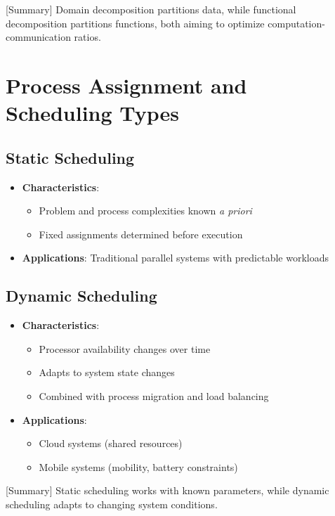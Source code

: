 \documentclass[12pt]{article}
\begin{document}
[Summary] Domain decomposition partitions data, while functional decomposition partitions functions, both aiming to optimize computation-communication ratios.

\section{Process Assignment and Scheduling Types}

\subsection{Static Scheduling}
\begin{itemize}
\item \textbf{Characteristics}:
  \begin{itemize}
  \item Problem and process complexities known \textit{a priori}
  \item Fixed assignments determined before execution
  \end{itemize}
  
\item \textbf{Applications}: Traditional parallel systems with predictable workloads
\end{itemize}

\subsection{Dynamic Scheduling}
\begin{itemize}
\item \textbf{Characteristics}:
  \begin{itemize}
  \item Processor availability changes over time
  \item Adapts to system state changes
  \item Combined with process migration and load balancing
  \end{itemize}
  
\item \textbf{Applications}:
  \begin{itemize}
  \item Cloud systems (shared resources)
  \item Mobile systems (mobility, battery constraints)
  \end{itemize}
\end{itemize}

[Summary] Static scheduling works with known parameters, while dynamic scheduling adapts to changing system conditions.
\end{document}
